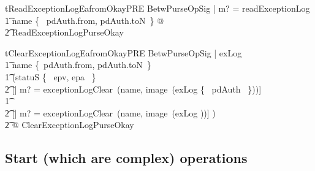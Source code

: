 \begin{LNewThm}
\begin{theorem}{tReadExceptionLogEafromOkayPRE}
   \forall BetwPurseOpSig | m? = readExceptionLog \\
        \t1 \land name \in \{~ pdAuth.from, pdAuth.toN~\} @ \\
            \t2 \pre ReadExceptionLogPurseOkay
\end{theorem}\end{LNewThm}


\begin{LNewThm}
\begin{theorem}{tClearExceptionLogEafromOkayPRE}
    \forall BetwPurseOpSig | exLog \neq \emptyset \\
        \t1 \land name \in  \{~pdAuth.from, pdAuth.toN~\} \\
        \t1 \land 
        (\IF statuS \in \{~ epv, epa ~\} \THEN \\
        	\t2 [| m? = exceptionLogClear~(name, image~(exLog \cup \{~ pdAuth ~\}))] \\
        \t1 \ELSE \\
        	\t2 [| m? = exceptionLogClear~(name, image~(exLog \cup \emptyset))] ) \\
        \t2 @ \pre ClearExceptionLogPurseOkay
\end{theorem}\end{LNewThm}


\subsection*{Start (which are complex) operations}

